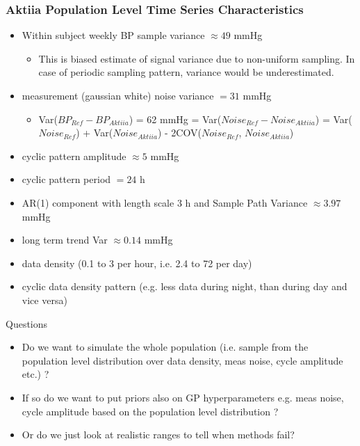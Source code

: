 \documentclass[
	8pt, %
]{beamer}
\begin{document}
\begin{frame}
	\frametitle{Aktiia Population Level Time Series Characteristics}

	\begin{itemize}
		\item Within subject weekly BP sample variance $\approx 49$ mmHg
		\begin{itemize}
			\item This is biased estimate of signal variance due to non-uniform sampling. In case
			of periodic sampling pattern, variance would be underestimated.
		\end{itemize}
		\item measurement (gaussian white) noise variance $=31$ mmHg
		\begin{itemize}
			\item Var($BP_{Ref} - BP_{Aktiia}$) = 62 mmHg = Var($Noise_{Ref} - Noise_{Aktiia}$) = Var($Noise_{Ref}$) + Var($Noise_{Aktiia}$) - 2COV($Noise_{Ref}$,
			$Noise_{Aktiia}$)
		\end{itemize}
		\item cyclic pattern amplitude $\approx 5$ mmHg
		\item cyclic pattern period $= 24$ h
		\item AR(1) component with length scale 3 h and Sample Path Variance $\approx 3.97$ mmHg
		\item long term trend Var $\approx 0.14$ mmHg
		\item data density (0.1 to 3 per hour, i.e. 2.4 to 72 per day)
		\item cyclic data density pattern (e.g. less data during night, than during day and vice versa)
	\end{itemize}

	\begin{block}{Questions}
		\begin{itemize}
			\item Do we want to simulate the whole population (i.e. sample from the population level distribution
		over data density, meas noise, cycle amplitude etc.) ?
			\item If so do we want to put priors also on GP hyperparameters e.g. meas noise, cycle amplitude based on
		the population level distribution ?
			\item Or do we just look at realistic ranges to tell when methods fail?
		\end{itemize}
	\end{block}


\end{frame}
\end{document}
